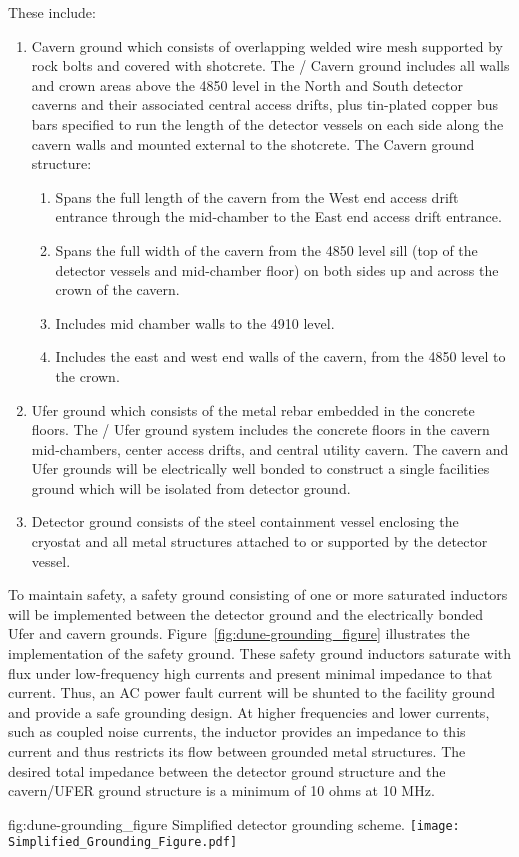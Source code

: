These include:
\begin{enumerate}
 \item Cavern ground which consists of overlapping welded wire mesh
   supported by rock bolts and covered with shotcrete. The
   / Cavern ground includes all walls and
   crown areas above the 4850 level in the North and South detector
   caverns and their associated central access drifts, plus tin-plated
   copper bus bars specified to run the length of the detector vessels
   on each side along the cavern walls and mounted external to the
   shotcrete.  The Cavern ground structure:
\begin{enumerate}
 \item Spans the full length of the cavern from the West end access
   drift entrance through the mid-chamber to the East end access drift
   entrance.
 \item Spans the full width of the cavern from the 4850 level sill
   (top of the detector vessels and mid-chamber floor) on both sides
   up and across the crown of the cavern.
 \item Includes mid chamber walls to the 4910 level.
 \item Includes the east and west end walls of the cavern, from the
   4850 level to the crown.
\end{enumerate}
 \item Ufer ground which consists of the metal rebar embedded in the
   concrete floors. The / Ufer ground system
   includes the concrete floors in the cavern mid-chambers, center
   access drifts, and central utility cavern. The cavern and Ufer
   grounds will be electrically well bonded to construct a single
   facilities ground which will be isolated from detector ground.
 \item Detector ground consists of the steel containment vessel
   enclosing the cryostat and all metal structures attached to or
   supported by the detector vessel.
\end{enumerate}

To maintain safety, a safety ground consisting of one or more
saturated inductors will be implemented between the detector ground
and the electrically bonded Ufer and cavern grounds.
Figure~\ref{fig:dune-grounding_figure} illustrates the implementation
of the safety ground. These safety ground inductors saturate with flux
under low-frequency high currents and present minimal impedance to
that current.  Thus, an AC power fault current will be shunted to the
facility ground and provide a safe grounding design. At higher
frequencies and lower currents, such as coupled noise currents, the
inductor provides an impedance to this current and thus restricts its
flow between grounded metal structures. The desired total impedance
between the detector ground structure and the cavern/UFER ground
structure is a minimum of 10 ohms at 10 MHz.
\begin{dunefigure}{fig:dune-grounding_figure}
  {Simplified detector grounding scheme.}
  \texttt{[image: Simplified\_Grounding\_Figure.pdf]}
\end{dunefigure}

